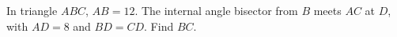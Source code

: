In triangle $ABC$, $AB=12$. The internal angle bisector from $B$ meets $AC$ at $D$, with $AD=8$ and $BD=CD$. Find $BC$.
